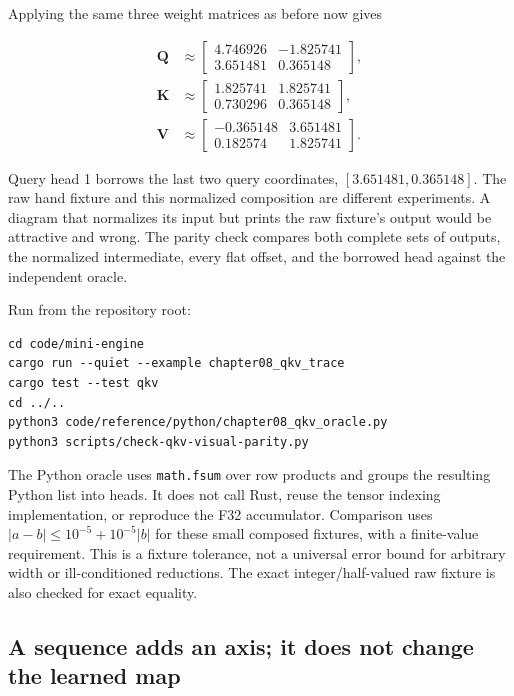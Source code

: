 \documentclass[
  10pt,
]{article}
\begin{document}
Applying the same three weight matrices as before now gives

\[
\begin{aligned}
\mathbf{Q}&\approx
\begin{bmatrix}4.746926&-1.825741\\3.651481&0.365148\end{bmatrix},\\
\mathbf{K}&\approx
\begin{bmatrix}1.825741&1.825741\\0.730296&0.365148\end{bmatrix},\\
\mathbf{V}&\approx
\begin{bmatrix}-0.365148&3.651481\\0.182574&1.825741\end{bmatrix}.
\end{aligned}
\]

Query head 1 borrows the last two query coordinates,
\([3.651481,0.365148]\). The raw hand fixture and this normalized
composition are different experiments. A diagram that normalizes its
input but prints the raw fixture's output would be attractive and wrong.
The parity check compares both complete sets of outputs, the normalized
intermediate, every flat offset, and the borrowed head against the
independent oracle.

Run from the repository root:

\begin{verbatim}
cd code/mini-engine
cargo run --quiet --example chapter08_qkv_trace
cargo test --test qkv
cd ../..
python3 code/reference/python/chapter08_qkv_oracle.py
python3 scripts/check-qkv-visual-parity.py
\end{verbatim}

The Python oracle uses \texttt{math.fsum} over row products and groups
the resulting Python list into heads. It does not call Rust, reuse the
tensor indexing implementation, or reproduce the F32 accumulator.
Comparison uses \(|a-b|\le 10^{-5}+10^{-5}|b|\) for these small composed
fixtures, with a finite-value requirement. This is a fixture tolerance,
not a universal error bound for arbitrary width or ill-conditioned
reductions. The exact integer/half-valued raw fixture is also checked
for exact equality.

\subsection{A sequence adds an axis; it does not change the learned
map}\label{a-sequence-adds-an-axis-it-does-not-change-the-learned-map}
\end{document}
